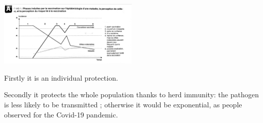 \documentclass{article}
\begin{document}

                








        \begin{center}
            \includegraphics[width=0.5\textwidth, angle=90]{imgs/Perception.jpg} %
        \end{center}


            Firstly it is an individual protection.

            Secondly it protects the whole population thanks to herd immunity: the pathogen is less likely to be transmitted ; otherwise it would be exponential,
                as people observed for the Covid-19 pandemic.

  

\end{document}
